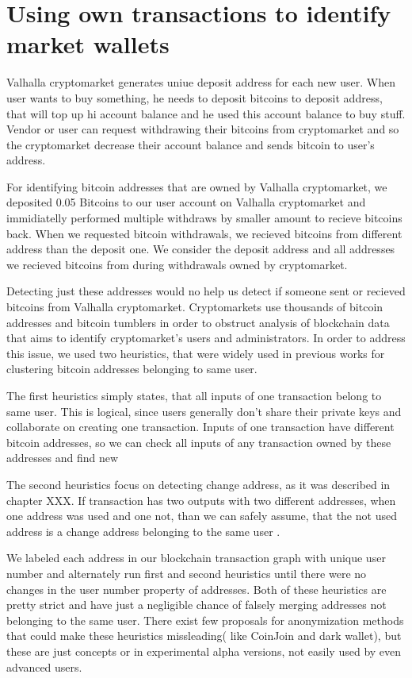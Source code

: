 \documentclass[
  digital, %
  table,   %
  lof,     %
  lot,     %
  oneside
]{fithesis3}
\begin{document}
\section{Using own transactions to identify market wallets}

Valhalla cryptomarket generates uniue deposit address for each new user.
When user wants to buy something, he needs to deposit bitcoins to deposit address,
that will top up hi account balance and he used this account balance to buy stuff.
Vendor or user can request withdrawing their bitcoins from cryptomarket and so
the cryptomarket decrease their account balance and sends bitcoin to user's address.

For identifying bitcoin addresses that are owned by Valhalla cryptomarket, we 
deposited 0.05 Bitcoins to our user account on Valhalla cryptomarket and immidiatelly
performed multiple withdraws by smaller amount to recieve bitcoins back.
When we requested bitcoin withdrawals, we recieved bitcoins from different address
than the deposit one. We consider the deposit address and all addresses we recieved
bitcoins from during withdrawals owned by cryptomarket.

Detecting just these addresses would no help us detect
if someone sent or recieved bitcoins from Valhalla cryptomarket.
Cryptomarkets use thousands of bitcoin addresses and
bitcoin tumblers in order to obstruct analysis of blockchain data
that aims to identify cryptomarket's users and administrators.
In order to address this issue, we used two heuristics, that were widely used
in previous works \parencite{androulaki2013evaluating}\parencite{reid2013analysis}
for clustering bitcoin addresses belonging to same user.

The first heuristics simply states, that all inputs of one transaction belong to same user. This is logical,
since users generally don't share their private keys and collaborate on creating one transaction.
Inputs of one transaction have different bitcoin addresses, so we can check all inputs of any transaction
owned by these addresses and find new 

The second heuristics focus on detecting change address, as it was described in chapter XXX.
If transaction has two outputs with two different addresses, when one address was used and one not,
than we can safely assume, that the not used address is a change address belonging to the same user \parencite{androulaki2013evaluating}.

We labeled each address in our blockchain transaction graph with unique user number
and alternately run first and second heuristics until there were no changes in the user number property of addresses.
Both of these heuristics are pretty strict and have just a negligible chance of falsely merging
addresses not belonging to the same user.
There exist few proposals for anonymization methods that could make
these heuristics missleading( like CoinJoin and dark wallet), but
these are just concepts or in experimental alpha versions, not easily
used by even advanced users.
\end{document}
